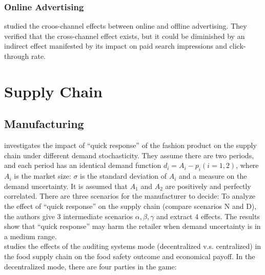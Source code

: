 \documentclass[12pt]{report}
\begin{document}
\subsubsection{Online Advertising}
\cite{Dinner2014} studied the croos-channel effects between online and offline advertising. They verified that the cross-channel effect exists, but it could be 
diminished by an indirect effect manifested by its impact on paid search impressions and click-through rate. 

\clearpage
\section{Supply Chain}

\subsection{Manufacturing}
\cite{chen2023quick} investigates the impact of ``quick response'' of the fashion product on the supply chain under
different demand stochasticity. They assume there are two periods, and each period has an identical demand function $d_i=A_i-p_i(i=1,2)$, where $A_i$ is the market size:
$\sigma$ is the standard deviation of $A_i$ and a measure on the demand uncertainty. It is assumed that $A_1$ and $A_2$ are positively and perfectly correlated. There are three scenarios for
the manufacturer to decide:
To analyze the effect of ``quick response'' on the supply chain (compare scenarios N and D), the authors give 3 intermediate scenarios $\alpha,\beta,\gamma$ and extract 4 effects.
The results show that ``quick response'' may harm the retailer when demand uncertainty is in a medium range.\\
\cite{dong2022food} studies the effects of the auditing systems mode (decentralized v.s. centralized) in the food supply chain
on the food safety outcome and economical payoff. In the decentralized mode, there are four parties in the game:
\end{document}
